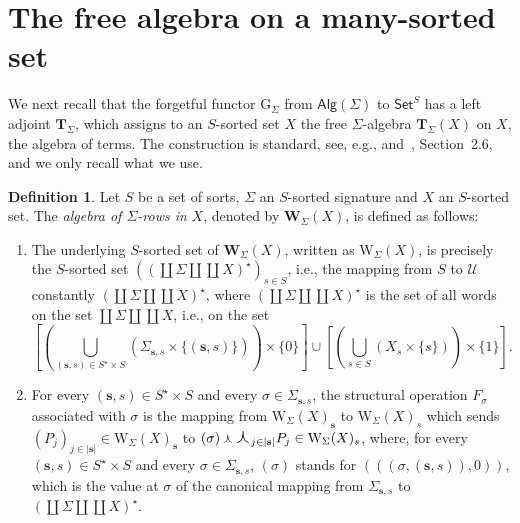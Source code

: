 \documentclass[a4paper, reqno]{amsbook}
\DeclareMathOperator{\bconcat}{\curlywedge}
\newcommand{\concat}{\ensuremath{\text{\Large $\curlywedge$}}}
\newcommand{\bb}[1]{\ensuremath{\lvert #1 \rvert}}
\theoremstyle{plain}
\theoremstyle{definition}
\newtheorem{definition}[theorem]{Definition}
\begin{document}
\section{The free algebra on a many-sorted set}\label{SFreeAlg}

We next recall that the forgetful functor $\mathrm{G}_{\Sigma}$ from $\mathsf{Alg}(\Sigma)$ to $\mathsf{Set}^{S}$ has a left adjoint $\mathbf{T}_{\Sigma}$, which assigns to an $S$-sorted set $X$ the free $\Sigma$-algebra $\mathbf{T}_{\Sigma}(X)$ on $X$, the algebra of terms.
The construction is standard, see, e.g., \cite{GoguenEtAl1978, Wechler1992} and~\cite{Soliveres2000}, Section~2.6, and we only recall what we use.

\begin{definition}\label{DRowAlg}
Let $S$ be a set of sorts, $\Sigma$ an $S$-sorted signature and $X$ an $S$-sorted set.
The \emph{algebra of $\Sigma$-rows in} $X$, denoted by $\mathbf{W}_{\Sigma}(X)$, is defined as follows:
\begin{enumerate}
\item The underlying $S$-sorted set of $\mathbf{W}_{\Sigma}(X)$, written as $\mathrm{W}_{\Sigma}(X)$, is precisely the $S$-sorted set $((\coprod\Sigma\amalg\coprod X)^{\star})_{s\in S}$, i.e., the mapping from $S$ to $\boldsymbol{\mathcal{U}}$ constantly $(\coprod\Sigma\amalg\coprod X)^{\star}$, where $(\coprod\Sigma\amalg\coprod X)^{\star}$ is the set of all words on the set $\coprod\Sigma\amalg\coprod X$, i.e., on the set
$$
\textstyle
\left[\left(\bigcup_{(\mathbf{s},s)\in S^{\star}\times S}(\Sigma_{\mathbf{s},s}\times\{(\mathbf{s},s)\})\right)\times\{0\}\right]\cup\left[\left(\bigcup_{s\in S}(X_{s}\times\{s\})\right)\times\{1\}\right].
$$
\item For every $(\mathbf{s},s)\in S^{\star}\times S$ and every $\sigma\in\Sigma_{\mathbf{s},s}$, the structural operation $F_{\sigma}$ associated with $\sigma$ is the mapping from $\mathrm{W}_{\Sigma}(X)_{\mathbf{s}}$ to $\mathrm{W}_{\Sigma}(X)_{s}$ which sends $(P_{j})_{j\in\bb{\mathbf{s}}}\in\mathrm{W}_{\Sigma}(X)_{\mathbf{s}}$ to $(\sigma)\bconcat\concat_{j\in\bb{\mathbf{s}}}P_{j}\in\mathrm{W}_{\Sigma}(X)_{s}$, where, for every $(\mathbf{s},s)\in S^{\star}\times S$ and every $\sigma\in\Sigma_{\mathbf{s},s}$, $(\sigma)$ stands for $(((\sigma,(\mathbf{s},s)),0))$, which is the value at $\sigma$ of the canonical mapping from $\Sigma_{\mathbf{s},s}$ to $(\coprod\Sigma\amalg\coprod X)^{\star}$.
\end{enumerate}
\end{definition}
\end{document}
